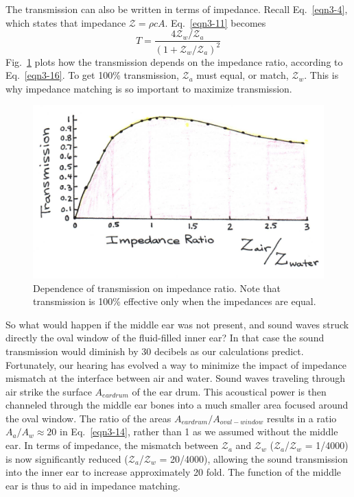 The transmission can also be written in terms of impedance.  Recall Eq.~\ref{eqn3-4}, which states that impedance $\mathcal{Z} = \rho cA$.  Eq.~\ref{eqn3-11} becomes
\begin{equation}\label{eqn3-16}
T = \frac{4\mathcal{Z}_w/\mathcal{Z}_a}{\left(1+\mathcal{Z}_w/\mathcal{Z}_a\right)^2}
\end{equation}
Fig.~\ref{Fig3-7} plots how the transmission depends on the impedance ratio, according to Eq.~\ref{eqn3-16}.  To get 100\% transmission, $\mathcal{Z}_a$ must equal, or match, $\mathcal{Z}_w$.  This is why impedance matching is so important to maximize transmission.  
 \begin{figure}[h]
	\centering
	\includegraphics[width=5in]{./figures/Topic3/Fig3-7.jpg}
	\caption{Dependence of transmission on impedance ratio.  Note that transmission is 100\% effective only when the impedances are equal.}
 	\label{Fig3-7}
 \end{figure}  
So what would happen if the middle ear was not present, and sound waves struck directly the oval window of the fluid-filled inner ear? In that case the sound transmission would diminish by 30 decibels as our calculations predict. Fortunately, our hearing has evolved a way to minimize the impact of impedance mismatch at the interface between air and water. Sound waves traveling through air strike the surface $A_{eardrum}$ of the ear drum. This acoustical power is then channeled through the middle ear bones into a much smaller area focused around the oval window. The ratio of the areas $A_{eardrum}/A_{oval-window}$ results in a ratio $A_a/A_w\approx 20$ in Eq.~\ref{eqn3-14}, rather than 1 as we assumed without the middle ear. In terms of impedance, the mismatch between $\mathcal{Z}_a$ and $\mathcal{Z}_w$ ($\mathcal{Z}_a$/$\mathcal{Z}_w$ = 1/4000) is now significantly reduced ($\mathcal{Z}_a$/$\mathcal{Z}_w$ = 20/4000), allowing the sound transmission into the inner ear to increase approximately 20 fold.  The function of the middle ear is thus to aid in impedance matching. 


